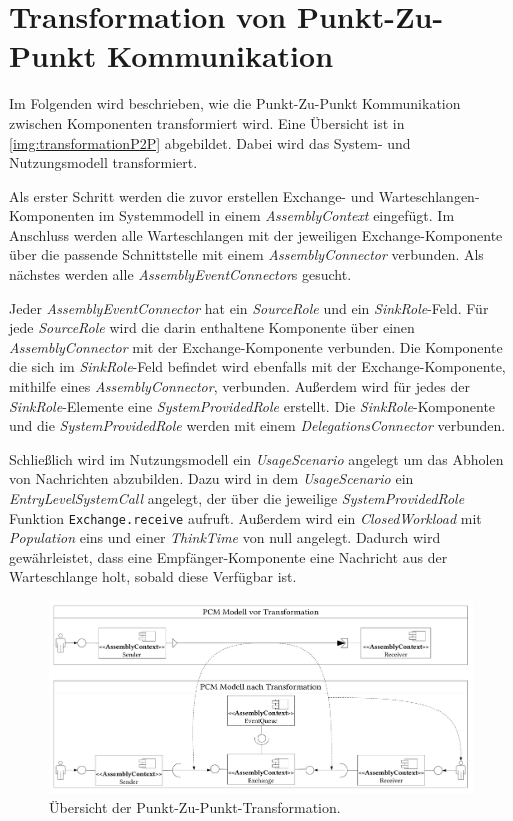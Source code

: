 \section{Transformation von Punkt-Zu-Punkt Kommunikation}
Im Folgenden wird beschrieben, wie die Punkt-Zu-Punkt Kommunikation zwischen Komponenten transformiert wird. Eine Übersicht ist in \autoref{img:transformationP2P} abgebildet. Dabei wird das System- und Nutzungsmodell transformiert. \par
Als erster Schritt werden die zuvor erstellen Exchange- und Warteschlangen-Kompo\-nenten im Systemmodell in einem \emph{AssemblyContext} eingefügt. Im Anschluss werden alle Warteschlangen mit der jeweiligen Exchange-Komponente über die passende Schnittstelle mit einem \emph{AssemblyConnector} verbunden. Als nächstes werden alle \emph{AssemblyEventConnector}s gesucht. 
\par
Jeder \emph{AssemblyEventConnector} hat ein \emph{SourceRole} und ein \emph{SinkRole}-Feld. Für jede \emph{SourceRole} wird die darin enthaltene Komponente über einen \emph{AssemblyConnector} mit der Exchange-Komponente verbunden. Die Komponente die sich im \emph{SinkRole}-Feld befindet wird ebenfalls mit der Exchange-Komponente, mithilfe eines \emph{AssemblyConnector}, verbunden. Außerdem wird für jedes der \emph{SinkRole}-Elemente eine \emph{SystemProvidedRole} erstellt. Die \emph{SinkRole}-Komponente und die \emph{SystemProvidedRole} werden mit einem \emph{DelegationsConnector} verbunden. \par
Schließlich wird im Nutzungsmodell ein \emph{UsageScenario} angelegt um das Abholen von Nachrichten abzubilden. Dazu wird in dem \emph{UsageScenario} ein \emph{EntryLevelSystemCall} angelegt, der über die jeweilige \emph{SystemProvidedRole} Funktion \texttt{Exchange.receive} aufruft. Außerdem wird ein \emph{ClosedWorkload} mit \emph{Population} eins und einer \emph{ThinkTime} von null angelegt. Dadurch wird gewährleistet, dass eine Empfänger-Komponente eine Nachricht aus der Warteschlange holt, sobald diese Verfügbar ist.

\begin{figure}
\center
  \includegraphics[width=1.3\textwidth, angle=90]{images/transformation/transformationSystemP2P.pdf}
  \caption{Übersicht der Punkt-Zu-Punkt-Transformation.}
  \label{img:transformationP2P}
\end{figure}

